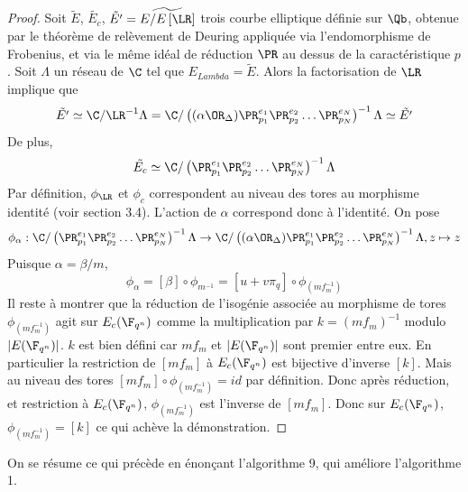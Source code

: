 \begin{proof}
	Soit $\tilde{E}$, $\tilde{E_c}$, $\tilde{E'} = \widetilde{E/E\left[\LR\right] }$ trois courbe elliptique définie sur $\Qb$, obtenue par le théorème de relèvement de Deuring appliquée via l'endomorphisme de Frobenius, et via le même idéal de réduction $\PR$ au dessus de la caractéristique $p$. Soit $\Lambda$ un réseau de $\C$ tel que $E_{Lambda} = \tilde{E}$. Alors la factorisation de $\LR$ implique que
	\begin{equation*}
		\tilde{E'}\simeq\C/\LR^{-1}\Lambda = \C/\left( (\alpha\OR_{\Delta})\PR_{p_{1}}^{e_{1}}\PR_{p_{2}}^{e_{2}}\ldots\PR_{p_{N}}^{e_{N}} \right)^{-1}\Lambda \simeq \tilde{E'}
	\end{equation*}
	De plus,
	\begin{equation*}
		\tilde{E_c} \simeq \C/\left(\PR_{p_{1}}^{e_{1}}\PR_{p_{2}}^{e_{2}}\ldots\PR_{p_{N}}^{e_{N}} \right)^{-1}\Lambda
	\end{equation*}
	Par définition, $\phi_{\LR}$ et $\phi_c$ correspondent au niveau des tores au morphisme identité (voir section 3.4). L'action de $\alpha$ correspond donc à l'identité. On pose
	\begin{equation*}
		\phi_{\alpha} : \C/\left(\PR_{p_{1}}^{e_{1}}\PR_{p_{2}}^{e_{2}}\ldots\PR_{p_{N}}^{e_{N}} \right)^{-1}\Lambda \rightarrow \C/\left( (\alpha\OR_{\Delta})\PR_{p_{1}}^{e_{1}}\PR_{p_{2}}^{e_{2}}\ldots\PR_{p_{N}}^{e_{N}} \right)^{-1}\Lambda, z \mapsto z
	\end{equation*}
	Puisque $\alpha = \beta/m$, 
	\begin{equation*}
		\phi_{\alpha} = [\beta]\circ\phi_{m^{-1}} = [u + v\pi_{q}]\circ\phi_{(mf_{m}^{-1})}
	\end{equation*}
	Il reste à montrer que la réduction de l'isogénie associée au morphisme de tores $\phi_{(mf_{m}^{-1})}$ agit sur $E_c(\F_{q^{n}})$ comme la multiplication par $k = (mf_{m})^{-1}$ modulo $|E(\F_{q^{n}})|$. $k$ est bien défini car $mf_{m}$ et $|E(\F_{q^{n}})|$ sont premier entre eux. En particulier la restriction de $[mf_{m}]$ à $E_c(\F_{q^{n}})$ est bijective d'inverse $[k]$. Mais au niveau des tores $[mf_{m}]\circ\phi_{(mf_{m}^{-1})} = id$ par définition. Donc après réduction, et restriction à $E_c(\F_{q^{n}})$, $\phi_{(mf_{m}^{-1})}$ est l'inverse de $[mf_{m}]$. Donc sur $E_c(\F_{q^{n}})$, $\phi_{(mf_{m}^{-1})} = [k]$ ce qui achève la démonstration.
\end{proof}


On se résume ce qui précède en énonçant l'algorithme 9, qui améliore l'algorithme 1. 

